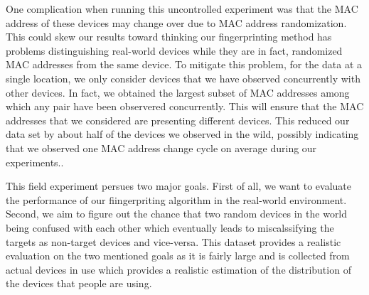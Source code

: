 One complication when running this uncontrolled experiment was that the MAC
	address of these devices may change over due to MAC address randomization. This could 
	skew our results toward thinking our fingerprinting method has
	problems distinguishing real-world devices while they are in fact, randomized MAC addresses from the same device.
	To mitigate this
	problem, for the data at a single location, we only consider devices
	that we have observed concurrently with other devices. In fact, we obtained the largest subset of MAC addresses among which any pair have been observered concurrently. This will ensure that the MAC addresses that we considered are presenting different devices.
	This reduced our data set by about half of the devices we observed in the wild, possibly indicating that we observed
	one MAC address change cycle on average during our experiments..

This field experiment persues two major goals. First of all, we want to
evaluate the performance of our fiingerpriting algorithm in the real-world
environment. Second, we aim to figure out the chance that two random devices in the world being
confused with each other which eventually leads to miscalssifying the targets
as non-target devices and vice-versa. This dataset provides a realistic evaluation on the two mentioned goals as it
is fairly large and is collected from actual devices in use which provides a
realistic estimation of the distribution of the devices that people are using.

